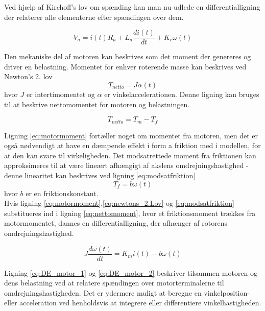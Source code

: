 Ved hjælp af Kirchoff's lov om spænding kan man nu udlede en differentialligning der relaterer alle elementerne efter spændingen over dem.

\begin{equation}\label{eq:DE_motor_1}
V_{a}=i(t)R_{a}+L_{a}\dfrac{di(t)}{dt}+K_{e}\omega(t)
\end{equation}

Den mekaniske del af motoren kan beskrives som det moment der genereres og driver en belastning. Momentet for enhver roterende masse kan beskrives ved Newton's 2. lov \\
\begin{equation}\label{eq:newtons_2.Lov}
T_{netto}=J\alpha(t)
\end{equation}
hvor $J$ er intertimomentet og $\alpha$ er vinkelaccelerationen. Denne ligning kan bruges til at beskrive nettomomentet for motoren og belastningen. 

\begin{equation}\label{eq:nettomoment}
T_{netto}=T_{m}-T_{f}
\end{equation}

Ligning \ref{eq:motormoment} fortæller noget om momentet fra motoren, men det er også nødvendigt at have en dæmpende effekt i form a friktion med i modellen, for at den kan svare til virkeligheden. Det modsatrettede moment fra friktionen kan approksimeres til at være lineært afhængigt af akslens omdrejningshastighed - denne linearitet kan beskrives ved ligning \eqref{eq:modsatfriktion}
\begin{equation}\label{eq:modsatfriktion}
T_{f}=b\omega(t)
\end{equation}
hvor $b$ er en friktionskonstant.\\Hvis ligning \ref{eq:motormoment},\ref{eq:newtons_2.Lov} og \ref{eq:modsatfriktion} substitueres ind i ligning \ref{eq:nettomoment}, hvor et friktionsmoment trækkes fra motormomentet, dannes en differentialligning, der afhænger af rotorens omdrejningshastighed.

\begin{equation}\label{eq:DE_motor_2}
J\dfrac{d\omega(t)}{dt}=K_{m}i(t)-b\omega(t)
\end{equation}

Ligning \ref{eq:DE_motor_1} og \ref{eq:DE_motor_2} beskriver tilsammen motoren og dens belastning ved at relatere spændingen over motorterminalerne til omdrejningshastigheden. Det er ydermere muligt at beregne en vinkelposition- eller acceleration ved henholdsvis at integrere eller differentiere vinkelhastigheden.


